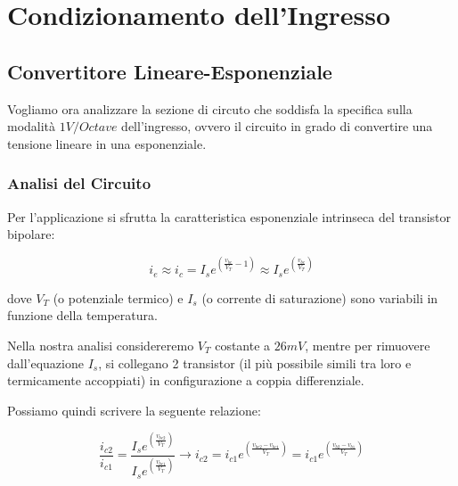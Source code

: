 \chapter{Condizionamento dell'Ingresso}


\section{Convertitore Lineare-Esponenziale}


Vogliamo ora analizzare la sezione di circuto che soddisfa la specifica sulla modalità
$1V/Octave$ dell'ingresso, ovvero il circuito in grado di convertire una tensione
lineare in una esponenziale.


\subsection*{Analisi del Circuito}


Per l'applicazione si sfrutta la caratteristica esponenziale intrinseca del transistor
bipolare:


$$
    i_e\approx i_c=I_s e^{\left(\frac{v_{be}}{V_T}-1\right)}
    \approx I_s e^{\left(\frac{v_{be}}{V_T}\right)}
$$

dove $V_T$ (o potenziale termico) e $I_s$ (o corrente di saturazione) sono variabili in
funzione della temperatura.

Nella nostra analisi considereremo $V_T$ costante a $26mV$, mentre per rimuovere dall'equazione
$I_s$, si collegano 2 transistor (il più possibile simili tra loro e termicamente
accoppiati) in configurazione a coppia differenziale.


Possiamo quindi scrivere la seguente relazione:

$$
    \frac{i_{c2}}{i_{c1}}=\frac{I_s e^{\left(\frac{v_{be2}}{V_T}\right)}}{I_s e^{\left(\frac{v_{be1}}{V_T}\right)}}
    \rightarrow
    i_{c2}=i_{c1}e^{\left(\frac{v_{be2}-v_{be1}}{V_T}\right)}=i_{c1}e^{\left(\frac{v_{b2}-v_{b1}}{V_T}\right)}
$$

